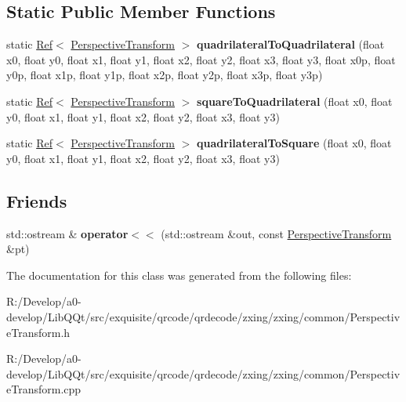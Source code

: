\subsection*{Static Public Member Functions}
\begin{DoxyCompactItemize}
\item 
\mbox{\label{classzxing_1_1_perspective_transform_a76d726324ffce6fd9f34b813cfa412e9}} 
static \mbox{\hyperlink{classzxing_1_1_ref}{Ref}}$<$ \mbox{\hyperlink{classzxing_1_1_perspective_transform}{Perspective\+Transform}} $>$ {\bfseries quadrilateral\+To\+Quadrilateral} (float x0, float y0, float x1, float y1, float x2, float y2, float x3, float y3, float x0p, float y0p, float x1p, float y1p, float x2p, float y2p, float x3p, float y3p)
\item 
\mbox{\label{classzxing_1_1_perspective_transform_aaf0eb1e6b11ea9d8c8cfafa8a7cb2b55}} 
static \mbox{\hyperlink{classzxing_1_1_ref}{Ref}}$<$ \mbox{\hyperlink{classzxing_1_1_perspective_transform}{Perspective\+Transform}} $>$ {\bfseries square\+To\+Quadrilateral} (float x0, float y0, float x1, float y1, float x2, float y2, float x3, float y3)
\item 
\mbox{\label{classzxing_1_1_perspective_transform_a254df89cc3c500b66d9733e9301cccc0}} 
static \mbox{\hyperlink{classzxing_1_1_ref}{Ref}}$<$ \mbox{\hyperlink{classzxing_1_1_perspective_transform}{Perspective\+Transform}} $>$ {\bfseries quadrilateral\+To\+Square} (float x0, float y0, float x1, float y1, float x2, float y2, float x3, float y3)
\end{DoxyCompactItemize}
\subsection*{Friends}
\begin{DoxyCompactItemize}
\item 
\mbox{\label{classzxing_1_1_perspective_transform_aaa8c61e1fbc2d51298cf25b8e3f7e153}} 
std\+::ostream \& {\bfseries operator$<$$<$} (std\+::ostream \&out, const \mbox{\hyperlink{classzxing_1_1_perspective_transform}{Perspective\+Transform}} \&pt)
\end{DoxyCompactItemize}


The documentation for this class was generated from the following files\+:\begin{DoxyCompactItemize}
\item 
R\+:/\+Develop/a0-\/develop/\+Lib\+Q\+Qt/src/exquisite/qrcode/qrdecode/zxing/zxing/common/Perspective\+Transform.\+h\item 
R\+:/\+Develop/a0-\/develop/\+Lib\+Q\+Qt/src/exquisite/qrcode/qrdecode/zxing/zxing/common/Perspective\+Transform.\+cpp\end{DoxyCompactItemize}
